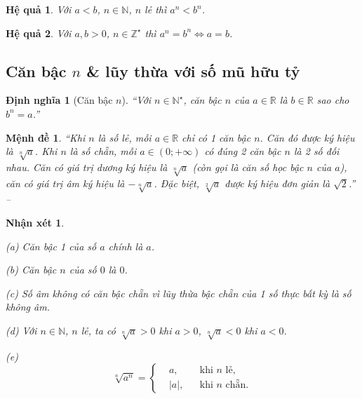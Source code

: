 \documentclass[oneside]{book}
\numberwithin{equation}{section}
\newtheorem{nhanxet}{Nhận xét}[section]
\newtheorem{hequa}{Hệ quả}[section]
\newtheorem{dinhnghia}{Định nghĩa}[section]
\newtheorem{menhde}{Mệnh đề}[section]
\begin{document}
\begin{hequa}
	Với $a < b$, $n\in\mathbb{N}$, $n$ lẻ thì $a^n < b^n$.
\end{hequa}

\begin{hequa}
	Với $a,b > 0$, $n\in\mathbb{Z}^\star$ thì $a^n = b^n\Leftrightarrow a = b$.
\end{hequa}

\subsection{Căn bậc $n$ \& lũy thừa với số mũ hữu tỷ}

\begin{dinhnghia}[Căn bậc $n$]
	``Với $n\in\mathbb{N}^\star$, \emph{căn bậc $n$} của $a\in\mathbb{R}$ là $b\in\mathbb{R}$ sao cho $b^n = a$.''
\end{dinhnghia}

\begin{menhde}
	``Khi $n$ là số lẻ, mỗi $a\in\mathbb{R}$ chỉ có 1 căn bậc $n$. Căn đó được ký hiệu là $\sqrt[n]{a}$. Khi $n$ là số chẵn, mỗi $a\in(0;+\infty)$ có đúng 2 căn bậc $n$ là 2 số đối nhau. Căn có giá trị dương ký hiệu là $\sqrt[n]{a}$ (còn gọi là \emph{căn số học bậc $n$} của $a$), căn có giá trị âm ký hiệu là $-\sqrt[n]{a}$. Đặc biệt, $\sqrt[2]{a}$ được ký hiệu đơn giản là $\sqrt{2}$.'' -- \cite[p. 72]{SGK_Toan_12_giai_tich_nang_cao}
\end{menhde}

\begin{nhanxet}
	\begin{enumerate*}
		\item[(a)] Căn bậc 1 của số $a$ chính là $a$.
		\item[(b)] Căn bậc $n$ của số $0$ là $0$.
		\item[(c)] Số âm không có căn bậc chẵn vì lũy thừa bậc chẵn của 1 số thực bất kỳ là số không âm.
		\item[(d)] Với $n\in\mathbb{N}$, $n$ lẻ, ta có $\sqrt[n]{a} > 0$ khi $a > 0$, $\sqrt[n]{a} < 0$ khi $a < 0$.
	\end{enumerate*}
	(e)
	\begin{equation*}
		\sqrt[n]{a^n} = \left\{\begin{split}
			&a,&&\mbox{khi } n\mbox{ lẻ},\\
			&|a|,&&\mbox{khi } n\mbox{ chẵn}.
		\end{split}\right.
	\end{equation*}
\end{nhanxet}
\end{document}
